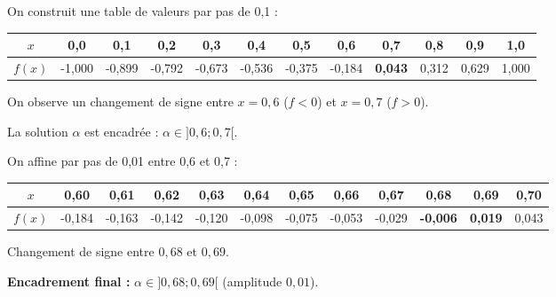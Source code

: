 \documentclass[11pt]{article}
\begin{document}
\begin{exemplebox}
On construit une table de valeurs par pas de 0,1 :
\begin{center}
\begin{tabular}{|c|*{11}{c|}}\hline
$x$ & 0,0 & 0,1 & 0,2 & 0,3 & 0,4 & 0,5 & 0,6 & 0,7 & 0,8 & 0,9 & 1,0 \\ \hline
$f(x)$ & -1,000 & -0,899 & -0,792 & -0,673 & -0,536 & -0,375 & -0,184 & \textbf{0,043} & 0,312 & 0,629 & 1,000 \\ \hline
\end{tabular}
\end{center}
\par
On observe un changement de signe entre $x=0,6$ ($f<0$) et $x=0,7$ ($f>0$).
\par
La solution $\alpha$ est encadrée : $\alpha \in ]0,6 ; 0,7[$.
\par
On affine par pas de 0,01 entre 0,6 et 0,7 :
\begin{center}
\begin{tabular}{|c|*{11}{c|}}\hline
$x$ & 0,60 & 0,61 & 0,62 & 0,63 & 0,64 & 0,65 & 0,66 & 0,67 & 0,68 & 0,69 & 0,70 \\ \hline
$f(x)$ & -0,184 & -0,163 & -0,142 & -0,120 & -0,098 & -0,075 & -0,053 & -0,029 & \textbf{-0,006} & \textbf{0,019} & 0,043 \\ \hline
\end{tabular}
\end{center}
\par
Changement de signe entre $0,68$ et $0,69$.
\par
\textbf{Encadrement final :} $\alpha \in ]0,68 ; 0,69[$ (amplitude $0,01$).
\end{exemplebox}
\end{document}
